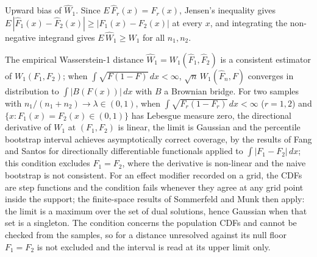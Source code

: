 \documentclass[AMA,Times1COL]{WileyNJDv5}
\begin{document}

Upward bias of $\widehat{W}_1$. Since $E\,\hat{F}_r(x) = F_r(x)$, Jensen's inequality gives $E\,|\hat{F}_1(x) - \hat{F}_2(x)| \geq |F_1(x) - F_2(x)|$ at every $x$, and integrating the non-negative integrand gives $E\,\widehat{W}_1 \geq W_1$ for all $n_1, n_2$.

The empirical Wasserstein-1 distance $\widehat{W}_1 = W_1(\hat{F}_1, \hat{F}_2)$ is a consistent estimator of $W_1(F_1, F_2)$; when $\int \sqrt{F(1-F)}\,dx < \infty$, $\sqrt{n}\,W_1(\hat{F}_n, F)$ converges in distribution to $\int |B(F(x))|\,dx$ with $B$ a Brownian bridge.\cite{delbarrio1999} For two samples with $n_1/(n_1+n_2) \to \lambda \in (0,1)$, when $\int \sqrt{F_r(1-F_r)}\,dx < \infty$ ($r = 1, 2$) and $\{x : F_1(x) = F_2(x) \in (0,1)\}$ has Lebesgue measure zero, the directional derivative of $W_1$ at $(F_1, F_2)$ is linear, the limit is Gaussian and the percentile bootstrap interval achieves asymptotically correct coverage, by the results of Fang and Santos for directionally differentiable functionals applied to $\int |F_1 - F_2|\,dx$;\cite{fang2019} this condition excludes $F_1 = F_2$, where the derivative is non-linear and the naive bootstrap is not consistent.\cite{dumbgen1993} For an effect modifier recorded on a grid, the CDFs are step functions and the condition fails whenever they agree at any grid point inside the support; the finite-space results of Sommerfeld and Munk then apply:\cite{sommerfeld2018} the limit is a maximum over the set of dual solutions, hence Gaussian when that set is a singleton. The condition concerns the population CDFs and cannot be checked from the samples, so for a distance unresolved against its null floor $F_1 = F_2$ is not excluded and the interval is read at its upper limit only.

\end{document}
